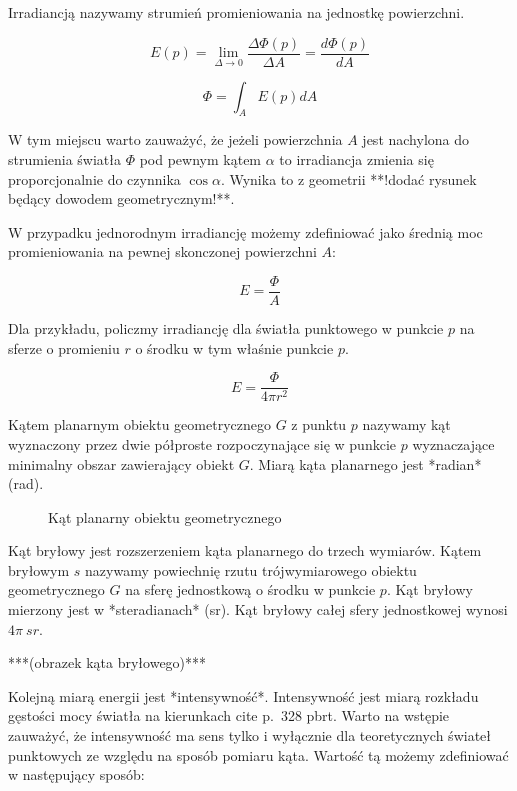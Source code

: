 \documentclass[../main.tex]{subfiles}
\begin{document}
Irradiancją nazywamy strumień promieniowania na jednostkę powierzchni.

$$
E(p) =
    \lim_{\Delta \rightarrow 0} {
        \frac{\Delta \Phi(p)}{\Delta A}
    } =
    \frac{d\Phi(p)}{dA}
$$

$$
\Phi = \int_{A} {
    E(p)
    dA
}
$$

W tym miejscu warto zauważyć, że jeżeli powierzchnia $A$ jest nachylona do
strumienia światła $\Phi$ pod pewnym kątem $\alpha$ to irradiancja zmienia się
proporcjonalnie do czynnika $\cos \alpha$. Wynika to z geometrii **!dodać
rysunek będący dowodem geometrycznym!**.

W przypadku jednorodnym irradiancję możemy zdefiniować jako średnią moc
promieniowania na pewnej skonczonej powierzchni $A$:

$$
E = \frac{\Phi}{A}
$$

Dla przykładu, policzmy irradiancję dla światła punktowego w punkcie $p$ na
sferze o promieniu $r$ o środku w tym właśnie punkcie $p$.

$$ E = \frac{\Phi}{4 \pi r^2} $$

Kątem planarnym obiektu geometrycznego $G$ z punktu $p$ nazywamy kąt wyznaczony
przez dwie półproste rozpoczynające się w punkcie $p$ wyznaczające minimalny
obszar zawierający obiekt $G$. Miarą kąta planarnego jest *radian* (rad).

\begin{figure}[ht]
  \centering
  \caption{Kąt planarny obiektu geometrycznego}
  \label{fig:PlanarAngle}
\end{figure}

Kąt bryłowy jest rozszerzeniem kąta planarnego do trzech wymiarów. Kątem
bryłowym $s$ nazywamy powiechnię rzutu trójwymiarowego obiektu geometrycznego
$G$ na sferę jednostkową o środku w punkcie $p$. Kąt bryłowy mierzony jest
w *steradianach* (sr). Kąt bryłowy całej sfery jednostkowej wynosi
  $4\pi \:{sr}$.

***(obrazek kąta bryłowego)***

Kolejną miarą energii jest *intensywność*. Intensywność jest miarą rozkładu
gęstości mocy światła na kierunkach cite p.~328 pbrt. Warto na wstępie
zauważyć, że intensywność ma sens tylko i wyłącznie dla teoretycznych świateł
punktowych ze względu na sposób pomiaru kąta. Wartość tą możemy zdefiniować w
następujący sposób:
\end{document}
